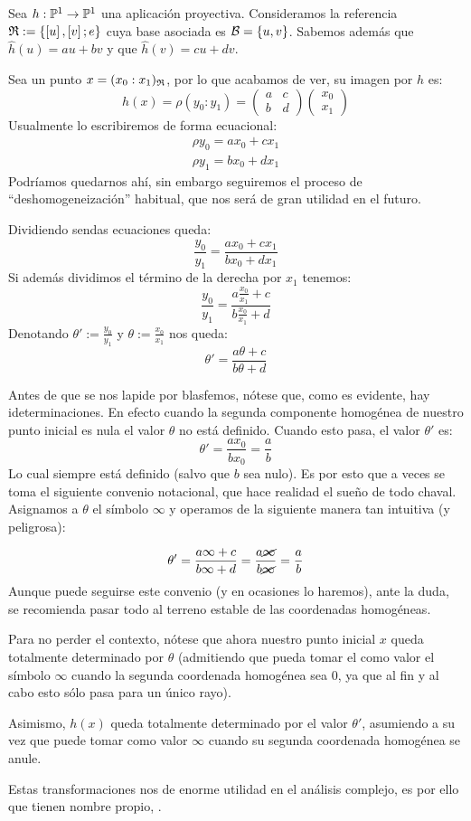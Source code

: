 \begin{exa}
	\label{C4_exa_mobius}
	Sea $h:\mathbb{P}^1\to\mathbb{P}^1$ una aplicación proyectiva. Consideramos la referencia $\mathfrak{R}:=\{\left [ u \right ],\left [ v \right ];e\}$ cuya base asociada es $\mathcal{B}=\{u,v\}$. Sabemos además que $\widehat{h}(u)=au+bv$ y que $\widehat{h}(v)=cu+dv$.
	
	Sea un punto $x=(x_0:x_1)_{\mathfrak{R}}$, por lo que acabamos de ver, su imagen por $h$ es:
	\[h(x)=\rho(y_0:y_1)=\begin{pmatrix}
	a & c\\
	b & d
	\end{pmatrix}\begin{pmatrix}
	x_0\\
	x_1
	\end{pmatrix}\]
	Usualmente lo escribiremos de forma ecuacional:
	\[\begin{array}{l}
	\rho y_0 = ax_0+cx_1\\
	\rho y_1 = bx_0+dx_1
	\end{array}\]
	Podríamos quedarnos ahí, sin embargo seguiremos el proceso de ``deshomogeneización'' habitual, que nos será de gran utilidad en el futuro.
	
	Dividiendo sendas ecuaciones queda:
	\[\frac{y_0}{y_1}=\frac{ax_0+cx_1}{bx_0+dx_1}\]
	Si además dividimos el término de la derecha por $x_1$ tenemos:
	\[\frac{y_0}{y_1}=\frac{a\frac{x_0}{x_1}+c}{b\frac{x_0}{x_1}+d}\]
	Denotando $\theta':=\frac{y_0}{y_1}$ y $\theta:=\frac{x_0}{x_1}$ nos queda:
	\[\theta'=\frac{a\theta+c}{b\theta+d}\]
	
	Antes de que se nos lapide por blasfemos, nótese que, como es evidente, hay ideterminaciones. En efecto cuando la segunda componente homogénea de nuestro punto inicial es nula el valor $\theta$ no está definido. Cuando esto pasa, el valor $\theta'$ es:
	\[\theta'=\frac{ax_0}{bx_0}=\frac{a}{b}\]
	Lo cual siempre está definido (salvo que $b$ sea nulo). Es por esto que a veces se toma el siguiente convenio notacional, que hace realidad el sueño de todo chaval. Asignamos a $\theta$ el símbolo $\infty$ y operamos de la siguiente manera tan intuitiva (y peligrosa):
	
	\[\theta'=\frac{a\infty+c}{b\infty+d}=\frac{a\cancel{\infty}}{b\cancel{\infty}}=\frac{a}{b}\]
	Aunque puede seguirse este convenio (y en ocasiones lo haremos), ante la duda, se recomienda pasar todo al terreno estable de las coordenadas homogéneas.
	
	Para no perder el contexto, nótese que ahora nuestro punto inicial $x$ queda totalmente determinado por $\theta$ (admitiendo que pueda tomar el como valor el símbolo $\infty$ cuando la segunda coordenada homogénea sea $0$, ya que al fin y al cabo esto sólo pasa para un único rayo).
	
	Asimismo, $h(x)$ queda totalmente determinado por el valor $\theta'$, asumiendo a su vez que puede tomar como valor $\infty$ cuando su segunda coordenada homogénea se anule.
	
	Estas transformaciones nos de enorme utilidad en el análisis complejo, es por ello que tienen nombre propio, .
\end{exa}
